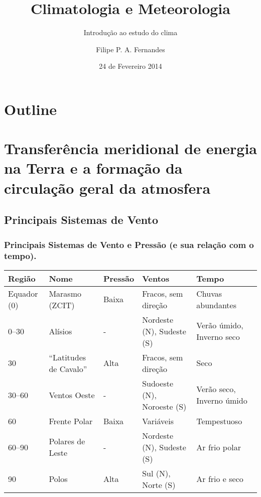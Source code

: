 \title[Aula 04]{Climatologia e Meteorologia}
\subtitle{Introdução ao estudo do clima}
\author[Filipe Fernandes]{Filipe P. A. Fernandes}
\date[Fevereiro 2014]{24 de Fevereiro 2014}




\begin{frame}[plain]
  \titlepage
\end{frame}

\section*{Outline}
\begin{frame}
\tableofcontents
\end{frame}

\section{Transferência meridional de energia na Terra e a formação da circulação geral da atmosfera}
\subsection{Principais Sistemas de Vento}

\begin{frame}
\frametitle{Principais Sistemas de Vento e Pressão (e sua relação com o tempo).}
{\tiny
\begin{table}
    \begin{tabular}{lllll}
    Região                           & Nome                     & Pressão & Ventos                     & Tempo                     \\
        \hline
    Equador (0\textdegree{})         & Marasmo (ZCIT)           & Baixa   & Fracos, sem direção        & Chuvas abundantes         \\
    0\textdegree{}--30\textdegree{}  & Alísios                  & -       & Nordeste (N), Sudeste (S)  & Verão úmido, Inverno seco \\
    30\textdegree{}                  & ``Latitudes de Cavalo''  & Alta    & Fracos, sem direção        & Seco                      \\
    30\textdegree{}--60\textdegree{} & Ventos Oeste             & -       & Sudoeste (N), Noroeste (S) & Verão seco, Inverno úmido \\
    60\textdegree{}                  & Frente Polar             & Baixa   & Variáveis                  & Tempestuoso               \\
    60\textdegree{}--90\textdegree{} & Polares de Leste         & -       & Nordeste (N), Sudeste (S)  & Ar frio polar             \\
    90\textdegree{}                  & Polos                    & Alta    & Sul (N), Norte (S)         & Ar frio e seco            \\
    \hline
    \end{tabular}
\end{table}
}
\end{frame}

